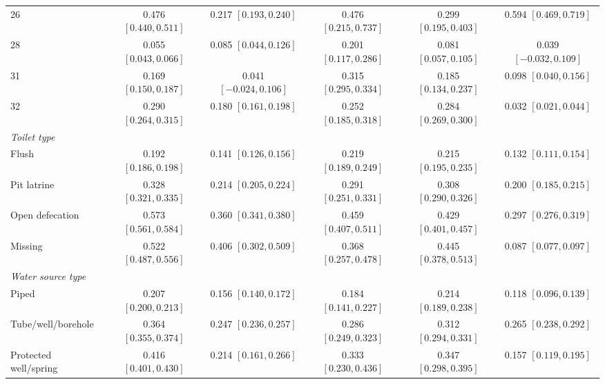 \begin{landscape}
\begin{longtable}{lccccc}
26 & 0.476 {\scriptsize$[0.440,0.511]$} & 0.217 {\scriptsize$[0.193,0.240]$} & 0.476 {\scriptsize$[0.215,0.737]$} & 0.299 {\scriptsize$[0.195,0.403]$} & 0.594 {\scriptsize$[0.469,0.719]$} \\
28 & 0.055 {\scriptsize$[0.043,0.066]$} & 0.085 {\scriptsize$[0.044,0.126]$} & 0.201 {\scriptsize$[0.117,0.286]$} & 0.081 {\scriptsize$[0.057,0.105]$} & 0.039 {\scriptsize$[-0.032,0.109]$} \\
31 & 0.169 {\scriptsize$[0.150,0.187]$} & 0.041 {\scriptsize$[-0.024,0.106]$} & 0.315 {\scriptsize$[0.295,0.334]$} & 0.185 {\scriptsize$[0.134,0.237]$} & 0.098 {\scriptsize$[0.040,0.156]$} \\
32 & 0.290 {\scriptsize$[0.264,0.315]$} & 0.180 {\scriptsize$[0.161,0.198]$} & 0.252 {\scriptsize$[0.185,0.318]$} & 0.284 {\scriptsize$[0.269,0.300]$} & 0.032 {\scriptsize$[0.021,0.044]$} \\
\midrule
\multicolumn{6}{l}{\textit{Toilet type}} \\
Flush & 0.192 {\scriptsize$[0.186,0.198]$} & 0.141 {\scriptsize$[0.126,0.156]$} & 0.219 {\scriptsize$[0.189,0.249]$} & 0.215 {\scriptsize$[0.195,0.235]$} & 0.132 {\scriptsize$[0.111,0.154]$} \\
Pit latrine & 0.328 {\scriptsize$[0.321,0.335]$} & 0.214 {\scriptsize$[0.205,0.224]$} & 0.291 {\scriptsize$[0.251,0.331]$} & 0.308 {\scriptsize$[0.290,0.326]$} & 0.200 {\scriptsize$[0.185,0.215]$} \\
Open defecation & 0.573 {\scriptsize$[0.561,0.584]$} & 0.360 {\scriptsize$[0.341,0.380]$} & 0.459 {\scriptsize$[0.407,0.511]$} & 0.429 {\scriptsize$[0.401,0.457]$} & 0.297 {\scriptsize$[0.276,0.319]$} \\
Missing & 0.522 {\scriptsize$[0.487,0.556]$} & 0.406 {\scriptsize$[0.302,0.509]$} & 0.368 {\scriptsize$[0.257,0.478]$} & 0.445 {\scriptsize$[0.378,0.513]$} & 0.087 {\scriptsize$[0.077,0.097]$} \\
\midrule
\multicolumn{6}{l}{\textit{Water source type}} \\
Piped & 0.207 {\scriptsize$[0.200,0.213]$} & 0.156 {\scriptsize$[0.140,0.172]$} & 0.184 {\scriptsize$[0.141,0.227]$} & 0.214 {\scriptsize$[0.189,0.238]$} & 0.118 {\scriptsize$[0.096,0.139]$} \\
Tube/well/borehole & 0.364 {\scriptsize$[0.355,0.374]$} & 0.247 {\scriptsize$[0.236,0.257]$} & 0.286 {\scriptsize$[0.249,0.323]$} & 0.312 {\scriptsize$[0.294,0.331]$} & 0.265 {\scriptsize$[0.238,0.292]$} \\
Protected well/spring & 0.416 {\scriptsize$[0.401,0.430]$} & 0.214 {\scriptsize$[0.161,0.266]$} & 0.333 {\scriptsize$[0.230,0.436]$} & 0.347 {\scriptsize$[0.298,0.395]$} & 0.157 {\scriptsize$[0.119,0.195]$} \\

\end{longtable}
\end{landscape}
